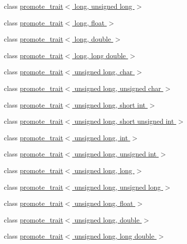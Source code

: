 \begin{DoxyCompactItemize}
\item 
class \hyperlink{classpromote__trait_3_01long_00_01unsigned_01long_01_4}{promote\+\_\+trait$<$ long, unsigned long $>$}
\item 
class \hyperlink{classpromote__trait_3_01long_00_01float_01_4}{promote\+\_\+trait$<$ long, float $>$}
\item 
class \hyperlink{classpromote__trait_3_01long_00_01double_01_4}{promote\+\_\+trait$<$ long, double $>$}
\item 
class \hyperlink{classpromote__trait_3_01long_00_01long_01double_01_4}{promote\+\_\+trait$<$ long, long double $>$}
\item 
class \hyperlink{classpromote__trait_3_01unsigned_01long_00_01char_01_4}{promote\+\_\+trait$<$ unsigned long, char $>$}
\item 
class \hyperlink{classpromote__trait_3_01unsigned_01long_00_01unsigned_01char_01_4}{promote\+\_\+trait$<$ unsigned long, unsigned char $>$}
\item 
class \hyperlink{classpromote__trait_3_01unsigned_01long_00_01short_01int_01_4}{promote\+\_\+trait$<$ unsigned long, short int $>$}
\item 
class \hyperlink{classpromote__trait_3_01unsigned_01long_00_01short_01unsigned_01int_01_4}{promote\+\_\+trait$<$ unsigned long, short unsigned int $>$}
\item 
class \hyperlink{classpromote__trait_3_01unsigned_01long_00_01int_01_4}{promote\+\_\+trait$<$ unsigned long, int $>$}
\item 
class \hyperlink{classpromote__trait_3_01unsigned_01long_00_01unsigned_01int_01_4}{promote\+\_\+trait$<$ unsigned long, unsigned int $>$}
\item 
class \hyperlink{classpromote__trait_3_01unsigned_01long_00_01long_01_4}{promote\+\_\+trait$<$ unsigned long, long $>$}
\item 
class \hyperlink{classpromote__trait_3_01unsigned_01long_00_01unsigned_01long_01_4}{promote\+\_\+trait$<$ unsigned long, unsigned long $>$}
\item 
class \hyperlink{classpromote__trait_3_01unsigned_01long_00_01float_01_4}{promote\+\_\+trait$<$ unsigned long, float $>$}
\item 
class \hyperlink{classpromote__trait_3_01unsigned_01long_00_01double_01_4}{promote\+\_\+trait$<$ unsigned long, double $>$}
\item 
class \hyperlink{classpromote__trait_3_01unsigned_01long_00_01long_01double_01_4}{promote\+\_\+trait$<$ unsigned long, long double $>$}
\item 

\end{DoxyCompactItemize}
